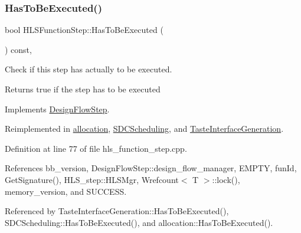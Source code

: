 \subsubsection{\texorpdfstring{Has\+To\+Be\+Executed()}{HasToBeExecuted()}}
{\footnotesize\ttfamily bool H\+L\+S\+Function\+Step\+::\+Has\+To\+Be\+Executed (\begin{DoxyParamCaption}{ }\end{DoxyParamCaption}) const\hspace{0.3cm}{\ttfamily [override]}, {\ttfamily [virtual]}}



Check if this step has actually to be executed. 

\begin{DoxyReturn}{Returns}
true if the step has to be executed 
\end{DoxyReturn}


Implements \hyperlink{classDesignFlowStep_a1783abe0c1d162a52da1e413d5d1ef05}{Design\+Flow\+Step}.



Reimplemented in \hyperlink{classallocation_af29b72851d7c54b1b6ea0b60daa162de}{allocation}, \hyperlink{classSDCScheduling_a2c5241704adbd9ab53968c7cbf549560}{S\+D\+C\+Scheduling}, and \hyperlink{classTasteInterfaceGeneration_a3cfa566432fc5a45a50ef491a4ba83f6}{Taste\+Interface\+Generation}.



Definition at line 77 of file hls\+\_\+function\+\_\+step.\+cpp.



References bb\+\_\+version, Design\+Flow\+Step\+::design\+\_\+flow\+\_\+manager, E\+M\+P\+TY, fun\+Id, Get\+Signature(), H\+L\+S\+\_\+step\+::\+H\+L\+S\+Mgr, Wrefcount$<$ T $>$\+::lock(), memory\+\_\+version, and S\+U\+C\+C\+E\+SS.



Referenced by Taste\+Interface\+Generation\+::\+Has\+To\+Be\+Executed(), S\+D\+C\+Scheduling\+::\+Has\+To\+Be\+Executed(), and allocation\+::\+Has\+To\+Be\+Executed().

